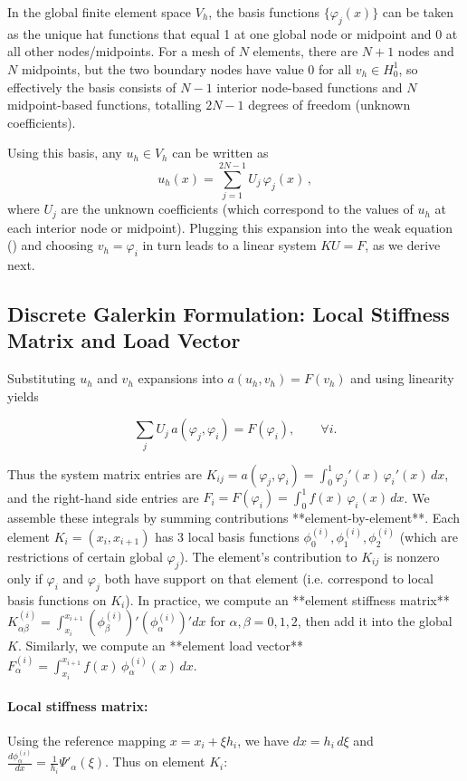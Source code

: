 In the global finite element space \(V_h\), the basis functions \(\{\varphi_j(x)\}\) can be taken as the unique hat functions that equal 1 at one global node or midpoint and 0 at all other nodes/midpoints.
For a mesh of \(N\) elements, there are \(N+1\) nodes and \(N\) midpoints, but the two boundary nodes have value 0 for all \(v_h \in H^1_0\), so effectively the basis consists of \(N-1\) interior node-based functions and \(N\) midpoint-based functions, totalling \(2N-1\) degrees of freedom (unknown coefficients).

Using this basis, any \(u_h \in V_h\) can be written as
\[
	u_h(x) = \sum_{j=1}^{2N-1} U_j\,\varphi_j(x)\, ,
\]
where \(U_j\) are the unknown coefficients (which correspond to the values of \(u_h\) at each interior node or midpoint). Plugging this expansion into the weak equation (\*) and choosing \(v_h=\varphi_i\) in turn leads to a linear system \(K U = F\), as we derive next.

\subsection{Discrete Galerkin Formulation: Local Stiffness Matrix and Load Vector}

Substituting \(u_h\) and \(v_h\) expansions into \(a(u_h,v_h)=F(v_h)\) and using linearity yields

\[\sum_{j} U_j\,a(\varphi_j,\varphi_i) = F(\varphi_i), \qquad \forall i.\]

Thus the system matrix entries are \(K_{ij} = a(\varphi_j,\varphi_i) = \int_0^1 \varphi_j'(x)\,\varphi_i'(x)\,dx\), and the right-hand side entries are \(F_i = F(\varphi_i) = \int_0^1 f(x)\,\varphi_i(x)\,dx\). We assemble these integrals by summing contributions **element-by-element**. Each element \(K_i=(x_i,x_{i+1})\) has 3 local basis functions \(\phi_0^{(i)},\phi_1^{(i)},\phi_2^{(i)}\) (which are restrictions of certain global \(\varphi_j\)). The element’s contribution to \(K_{ij}\) is nonzero only if \(\varphi_i\) and \(\varphi_j\) both have support on that element (i.e. correspond to local basis functions on \(K_i\)). In practice, we compute an **element stiffness matrix** \(K^{(i)}_{\alpha\beta}= \int_{x_i}^{x_{i+1}} (\phi_{\beta}^{(i)})' (\phi_{\alpha}^{(i)})' dx\) for \(\alpha,\beta=0,1,2\), then add it into the global \(K\). Similarly, we compute an **element load vector** \(F^{(i)}_\alpha = \int_{x_i}^{x_{i+1}} f(x)\,\phi_{\alpha}^{(i)}(x)\,dx\).

\paragraph{Local stiffness matrix:}
Using the reference mapping \(x = x_i + \xi h_i\), we have \(dx = h_i\,d\xi\) and \(\frac{d\phi_{\alpha}^{(i)}}{dx} = \frac{1}{h_i}\Psi'_\alpha(\xi)\). Thus on element \(K_i\):


